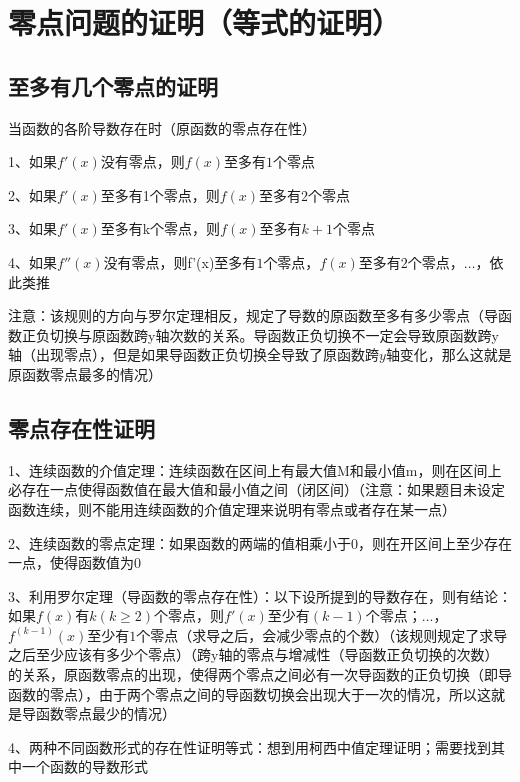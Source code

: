 \section{零点问题的证明（等式的证明）}



\subsection{至多有几个零点的证明}

当函数的各阶导数存在时（原函数的零点存在性）

1、如果$f'(x)$没有零点，则$f(x)$至多有$1$个零点

2、如果$f'(x)$至多有1个零点，则$f(x)$至多有$2$个零点

3、如果$f'(x)$至多有k个零点，则$f(x)$至多有$k+1$个零点

4、如果$f''(x)$没有零点，则f'(x)至多有$1$个零点，$f(x)$至多有$2$个零点，$…$，依此类推

注意：该规则的方向与罗尔定理相反，规定了导数的原函数至多有多少零点（导函数正负切换与原函数跨y轴次数的关系。导函数正负切换不一定会导致原函数跨y轴（出现零点），但是如果导函数正负切换全导致了原函数跨$y$轴变化，那么这就是原函数零点最多的情况）



\subsection{零点存在性证明}

1、连续函数的介值定理：连续函数在区间上有最大值M和最小值m，则在区间上必存在一点使得函数值在最大值和最小值之间（闭区间）（注意：如果题目未设定函数连续，则不能用连续函数的介值定理来说明有零点或者存在某一点）

2、连续函数的零点定理：如果函数的两端的值相乘小于0，则在开区间上至少存在一点，使得函数值为0

3、利用罗尔定理（导函数的零点存在性）：以下设所提到的导数存在，则有结论：如果$f(x)$有$k(k≥2)$个零点，则$f'(x)$至少有$(k-1)$个零点；$…$，$f^{(k-1)}(x)$至少有$1$个零点（求导之后，会减少零点的个数）（该规则规定了求导之后至少应该有多少个零点）（跨y轴的零点与增减性（导函数正负切换的次数）的关系，原函数零点的出现，使得两个零点之间必有一次导函数的正负切换（即导函数的零点），由于两个零点之间的导函数切换会出现大于一次的情况，所以这就是导函数零点最少的情况）

4、两种不同函数形式的存在性证明等式：想到用柯西中值定理证明；需要找到其中一个函数的导数形式

